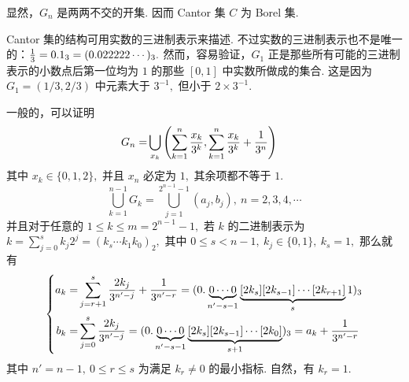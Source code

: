 \documentclass[12pt, a4paper, oneside]{book}
\numberwithin{figure}{section}
\theoremstyle{definition}
\begin{document}
显然，$G_n$ 是两两不交的开集. 因而 Cantor 集 $C$ 为 Borel 集.

Cantor 集的结构可用实数的三进制表示来描述. 不过实数的三进制表示也不是唯一的：${1\over 3}=0.1_3=(0.022222\cdots)_3.$ 然而，容易验证，$G_1$ 正是那些所有可能的三进制表示的小数点后第一位均为 $1$ 的那些 $[0,1]$ 中实数所做成的集合. 这是因为 $G_1=(1/3,2/3)$ 中元素大于 $3^{-1},$ 但小于 $2\times 3^{-1}.$ 

一般的，可以证明
\begin{equation}\label{structure of Cantor set}
    \begin{aligned}
        G_n =& \bigcup_{x_k}\left(\sum_{k=1}^{n} {x_k\over 3^k}, \sum_{k=1}^{n} {x_k\over 3^k}+{1\over 3^{n}}\right)
    \end{aligned}
\end{equation}
其中 $x_k\in\{0,1,2\},$ 并且 $x_n$ 必定为 $1,$ 其余项都不等于 $1.$ 
\begin{equation}
    \bigcup_{k=1}^{n-1} G_k = \bigcup_{j=1}^{2^{n-1}-1}(a_j,b_j),\ n=2,3,4,\cdots
\end{equation}
并且对于任意的 $1\leq k\leq m=2^{n-1}-1,$ 若 $k$ 的二进制表示为 $k=\sum_{j=0}^s k_j2^j=(k_s\cdots k_1k_0)_2,$ 其中 $0\leq s<n-1,\ k_j\in\{0,1\},\ k_s=1,$ 那么就有
\begin{equation}\label{endpoints of Cantor set}
    \left\{
        \begin{aligned}
            a_k =&\sum_{j=r+1}^s {2k_j\over 3^{n'-j}}+{1\over 3^{n'-r}}=(0.\underbrace{0\cdots 0}_{n'-s-1}\underbrace{[2k_s][2k_{s-1}]\cdots [2k_{r+1}]}_{s}1)_3\\
            b_k =&\sum_{j=0}^s {2k_j\over 3^{n'-j}}=(0.\underbrace{0\cdots 0}_{n'-s-1}\underbrace{[2k_s][2k_{s-1}]\cdots [2k_{0}]}_{s+1})_3=a_k+{1\over 3^{n'-r}}
        \end{aligned}
    \right.
\end{equation}
其中 $n'=n-1,\ 0\leq r\leq s$ 为满足 $k_r\neq 0$ 的最小指标. 自然，有 $k_r=1.$
\end{document}
